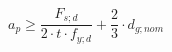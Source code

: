 \documentclass[12pt]{article}
\begin{document}
\begin{displaymath}
a_p \geq \frac {F_{s;d}} {2 \cdot t \cdot f_{y;d}} + \frac {2} {3} \cdot d_{g;nom}
\end{displaymath}
\end{document}
